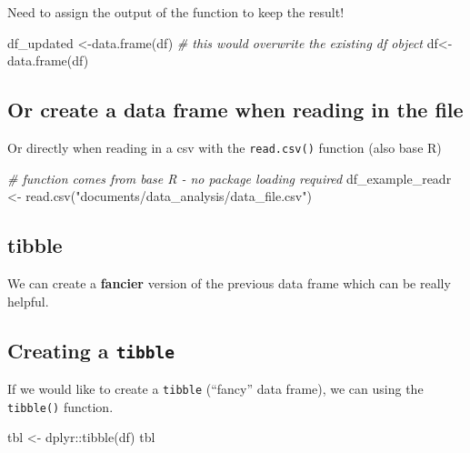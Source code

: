 \documentclass[
]{article}
\newenvironment{Shaded}{\begin{snugshade}}{\end{snugshade}}
\newcommand{\CommentTok}[1]{\textcolor[rgb]{0.56,0.35,0.01}{\textit{#1}}}
\newcommand{\FunctionTok}[1]{\textcolor[rgb]{0.00,0.00,0.00}{#1}}
\newcommand{\NormalTok}[1]{#1}
\newcommand{\OtherTok}[1]{\textcolor[rgb]{0.56,0.35,0.01}{#1}}
\newcommand{\SpecialCharTok}[1]{\textcolor[rgb]{0.00,0.00,0.00}{#1}}
\newcommand{\StringTok}[1]{\textcolor[rgb]{0.31,0.60,0.02}{#1}}
\begin{document}
Need to assign the output of the function to keep the result!

\begin{Shaded}
\begin{Highlighting}[]
\NormalTok{df\_updated }\OtherTok{\textless{}{-}}\FunctionTok{data.frame}\NormalTok{(df)}
\CommentTok{\# this would overwrite the existing df object}
\NormalTok{df}\OtherTok{\textless{}{-}}\FunctionTok{data.frame}\NormalTok{(df) }
\end{Highlighting}
\end{Shaded}

\hypertarget{or-create-a-data-frame-when-reading-in-the-file}{%
\subsection{Or create a data frame when reading in the
file}\label{or-create-a-data-frame-when-reading-in-the-file}}

Or directly when reading in a csv with the \texttt{read.csv()} function
(also base R)

\begin{Shaded}
\begin{Highlighting}[]
\CommentTok{\# function comes from base R {-} no package loading required}
\NormalTok{df\_example\_readr }\OtherTok{\textless{}{-}} \FunctionTok{read.csv}\NormalTok{(}\StringTok{"documents/data\_analysis/data\_file.csv"}\NormalTok{)}
\end{Highlighting}
\end{Shaded}

\hypertarget{tibble}{%
\subsection{tibble}\label{tibble}}

We can create a \textbf{fancier} version of the previous data frame
which can be really helpful.

\hypertarget{creating-a-tibble}{%
\subsection{\texorpdfstring{Creating a
\texttt{tibble}}{Creating a tibble}}\label{creating-a-tibble}}

If we would like to create a \texttt{tibble} (``fancy'' data frame), we
can using the \texttt{tibble()} function.

\begin{Shaded}
\begin{Highlighting}[]
\NormalTok{tbl }\OtherTok{\textless{}{-}}\NormalTok{ dplyr}\SpecialCharTok{::}\FunctionTok{tibble}\NormalTok{(df) }
\NormalTok{tbl}
\end{Highlighting}
\end{Shaded}
\end{document}
